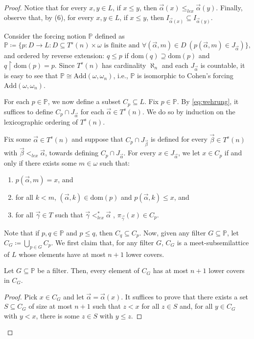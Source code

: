 \documentclass[10pt,a4paper]{amsart}
\begin{document}
\begin{proof}
Notice that for every $x,y \in L$, if $x \le y$, then $\vec{\alpha}(x) \le_{lex}\vec{\alpha}(y)$. Finally, observe that, by (6), for every $x,y \in L$, if $x \le y$, then $I_{\vec{\alpha}(x)} \subseteq I_{\vec{\alpha}(y)}$.

Consider the forcing notion $\mathbb{P}$ defined as
\[
\mathbb{P} \coloneqq \big\{p:D \rightarrow L : D \subseteq T^s(n) \times \omega \text{ is finite and } \forall (\vec{\alpha}, m) \in D \ (p(\vec{\alpha}, m) \in J_{\vec{\alpha}})\big\},
\]
and ordered by reverse extension: $q \le p$ if $\mathrm{dom}(q) \supseteq \mathrm{dom}(p)$ and $q \upharpoonright \mathrm{dom}(p) = p$. Since $T^s(n)$ has cardinality $\aleph_n$ and each $J_{\vec{\alpha}}$ is countable, it is easy to see that $\mathbb{P} \cong \text{Add}(\omega, \omega_n)$, i.e., $\mathbb{P}$ is isomorphic to Cohen's forcing $\text{Add}(\omega, \omega_n)$.

For each $p \in \mathbb{P}$, we now define a subset $C_p \subseteq L$. Fix $p \in \mathbb{P}$. By \eqref{eq:wehrung}, it suffices to define $C_p \cap J_{\vec{\alpha}}$ for each  $\vec{\alpha} \in T^s(n)$. We do so by induction on the lexicographic ordering of $T^s(n)$. 

Fix some $\vec{\alpha} \in T^s(n)$ and suppose that $C_p \cap J_{\vec{\beta}}$ is defined for every $\vec{\beta} \in T^s(n)$ with $\vec{\beta} <_{lex} \vec{\alpha}$, towards defining $C_p \cap J_{\vec{\alpha}}$. For every $x \in J_{\vec{\alpha}}$, we let $x \in C_p$ if and only if there exists some $m \in \omega$ such that:
\begin{enumerate}[label=(\alph*)]
\item $p (\vec{\alpha}, m) = x$, and
\item for all $k < m$,  $(\vec{\alpha}, k) \in \mathrm{dom}(p)$ and $p(\vec{\alpha}, k) \le x$, and
\item for all $\vec{\gamma} \in T$ such that $\vec{\gamma} <_{lex}^* \vec{\alpha}$ ,  $\pi_{\vec{\gamma}}(x) \in C_p$.
\end{enumerate}
Note that if $p,q \in \mathbb{P}$ and $p \le q$, then $C_q \subseteq C_p$. Now, given any filter $G \subseteq \mathbb{P}$, let  $C_G \coloneqq \bigcup_{p \in G} C_p$. We first claim that, for any filter $G$, $C_G$ is a meet-subsemilattice of $L$ whose elements have at most $n+1$ lower covers.

\begin{claim}
Let $G\subseteq \mathbb{P}$ be a filter. Then, every element of $C_G$ has at most $n+1$ lower covers in $C_G$.
\end{claim}
\begin{proof}
Pick $x \in C_G$ and let $\vec{\alpha} = \vec{\alpha}(x)$. It suffices to prove that there exists a set $S \subseteq C_G$ of size at most $n+1$ such that $z < x$ for all $z \in S$ and, for all $y \in C_G$ with $y < x$, there is some $z \in S$ with $y \le z$.


\end{proof}
\end{proof}
\end{document}
